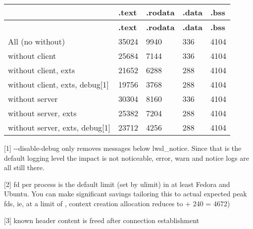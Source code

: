 \tabulinesep=1mm
\begin{longtabu} spread 0pt [c]{*5{|X[-1]}|}
\hline
\rowcolor{\tableheadbgcolor}{\bf }&{\bf .text }&{\bf .rodata }&{\bf .data }&{\bf .bss  }\\
\endfirsthead
\hline
\endfoot
\hline
\rowcolor{\tableheadbgcolor}{\bf }&{\bf .text }&{\bf .rodata }&{\bf .data }&{\bf .bss  }\\
\endhead
All (no without) &35024 &9940 &336 &4104 \\
without client &25684 &7144 &336 &4104 \\
without client, exts &21652 &6288 &288 &4104 \\
without client, exts, debug\mbox{[}1\mbox{]} &19756 &3768 &288 &4104 \\
without server &30304 &8160 &336 &4104 \\
without server, exts &25382 &7204 &288 &4104 \\
without server, exts, debug\mbox{[}1\mbox{]} &23712 &4256 &288 &4104 \\
\end{longtabu}
\mbox{[}1\mbox{]} {\ttfamily -\/-\/disable-\/debug} only removes messages below {\ttfamily lwsl\+\_\+notice}. Since that is the default logging level the impact is not noticeable, error, warn and notice logs are all still there.

\mbox{[}2\mbox{]} {} fd per process is the default limit (set by ulimit) in at least Fedora and Ubuntu. You can make significant savings tailoring this to actual expected peak fds, ie, at a limit of {}, context creation allocation reduces to { + 240 = 4672})

\mbox{[}3\mbox{]} known header content is freed after connection establishment 